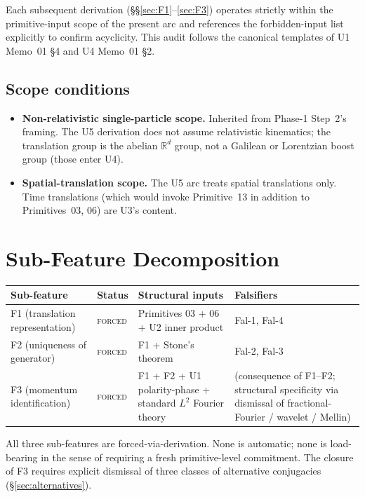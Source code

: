 \documentclass[11pt,a4paper]{article}
\begin{document}
Each subsequent derivation (\S\S\ref{sec:F1}--\ref{sec:F3}) operates strictly within the primitive-input scope of the present arc and references the forbidden-input list explicitly to confirm acyclicity. This audit follows the canonical templates of U1 Memo~01 \S4 and U4 Memo~01 \S2.

\subsection{Scope conditions}

\begin{itemize}
  \item \textbf{Non-relativistic single-particle scope.} Inherited from Phase-1 Step~2's framing. The U5 derivation does not assume relativistic kinematics; the translation group is the abelian $\mathbb{R}^d$ group, not a Galilean or Lorentzian boost group (those enter U4).
  \item \textbf{Spatial-translation scope.} The U5 arc treats spatial translations only. Time translations (which would invoke Primitive~13 in addition to Primitives~03, 06) are U3's content.
\end{itemize}

\section{Sub-Feature Decomposition}\label{sec:decomposition}

\begin{center}
\begin{tabular}{p{2.5cm}p{1.8cm}p{6.5cm}p{3.5cm}}
\hline
Sub-feature & Status & Structural inputs & Falsifiers \\
\hline
F1 (translation representation) & \textsc{forced} & Primitives 03 + 06 + U2 inner product & Fal-1, Fal-4 \\
F2 (uniqueness of generator) & \textsc{forced} & F1 + Stone's theorem & Fal-2, Fal-3 \\
F3 (momentum identification) & \textsc{forced} & F1 + F2 + U1 polarity-phase + standard $L^2$ Fourier theory & (consequence of F1--F2; structural specificity via dismissal of fractional-Fourier / wavelet / Mellin) \\
\hline
\end{tabular}
\end{center}

All three sub-features are forced-via-derivation. None is automatic; none is load-bearing in the sense of requiring a fresh primitive-level commitment. The closure of F3 requires explicit dismissal of three classes of alternative conjugacies (\S\ref{sec:alternatives}).
\end{document}
